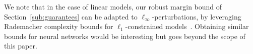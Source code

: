 We note that in the case of linear models, our robust margin bound of Section~\ref{sub:guarantees} can be adapted to
$\ell_\infty$-perturbations, by leveraging Rademacher complexity bounds for $\ell_1$-constrained models~\citep{kakade2009complexity}.
Obtaining similar bounds for neural networks would be interesting but goes beyond the scope of this paper.



